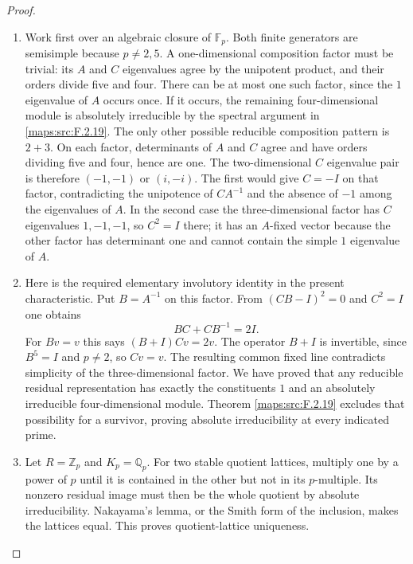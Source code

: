 \documentclass[11pt,a4paper]{article}
\theoremstyle{definition}
\begin{document}
\begin{proof}
\begin{enumerate}[label=\arabic*.]
\item Work first over an algebraic closure of $\mathbb F_p$.
Both finite generators are semisimple because $p\ne2,5$.
A one-dimensional composition factor must be trivial:
its $A$ and $C$ eigenvalues agree by the unipotent product,
and their orders divide five and four.
There can be at most one such factor, since the $1$
eigenvalue of $A$ occurs once.
If it occurs, the remaining four-dimensional module is
absolutely irreducible by the spectral argument in \ref{maps:src:F.2.19}.
The only other possible reducible composition pattern is
$2+3$.
On each factor, determinants of $A$ and $C$ agree and
have orders dividing five and four, hence are one.
The two-dimensional $C$ eigenvalue pair is therefore
$(-1,-1)$ or $(i,-i)$.
The first would give $C=-I$ on that factor, contradicting
the unipotence of $CA^{-1}$ and the absence of $-1$
among the eigenvalues of $A$.
In the second case the three-dimensional factor has
$C$ eigenvalues $1,-1,-1$, so $C^2=I$ there; it has
an $A$-fixed vector because the other factor has determinant
one and cannot contain the simple $1$ eigenvalue of $A$.

\item Here is the required elementary involutory identity in the
present characteristic.  Put $B=A^{-1}$ on this factor.
From $(CB-I)^2=0$ and $C^2=I$ one obtains
\[
 BC+CB^{-1}=2I.
\]
For $Bv=v$ this says $(B+I)Cv=2v$.
The operator $B+I$ is invertible, since $B^5=I$ and
$p\ne2$, so $Cv=v$.  The resulting common fixed line
contradicts simplicity of the three-dimensional factor.
We have proved that any reducible residual representation
has exactly the constituents $1$ and an absolutely
irreducible four-dimensional module.  Theorem \ref{maps:src:F.2.19}
excludes that possibility for a survivor, proving absolute
irreducibility at every indicated prime.

\item Let $R=\mathbb Z_p$ and $K_p=\mathbb Q_p$.
For two stable quotient lattices, multiply one by a power
of $p$ until it is contained in the other but not in its
$p$-multiple.  Its nonzero residual image must then be the
whole quotient by absolute irreducibility.  Nakayama's
lemma, or the Smith form of the inclusion, makes the
lattices equal.  This proves quotient-lattice uniqueness.


\end{enumerate}
\end{proof}
\end{document}
